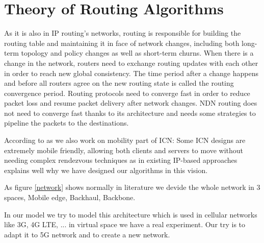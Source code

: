 

\chapter{Theory of Routing Algorithms} %
\label{dash7}


As it is also in IP routing's networks, routing is responsible for building the routing table and maintaining it in face of network changes, including both long-term topology and policy changes as well as short-term churns.  When there is a change in the network, routers need to exchange routing updates with each other in order to reach new global consistency. The time period after a change happens and before all routers agree on the new routing state is called the routing convergence period. Routing protocols need to converge fast in order to reduce packet loss and resume packet delivery after network changes. NDN routing does not need to converge fast thanks to its architecture and needs some strategies to pipeline the packets to the destinations.

According to \cite{oran} as we also work on mobility part of ICN: Some ICN designs are extremely mobile friendly, allowing  both  clients  and  servers  to  move  without  needing complex rendezvous techniques as in existing   IP-based approaches explains well why we have designed our algorithms in this vision.

As figure \ref{network} shows normally in literature we devide the whole network in 3 spaces, Mobile edge, Backhaul, Backbone. 

In our model we try to model this architecture which is used in cellular networks like 3G, 4G LTE, ... in virtual space we have a real experiment.
Our try is to adapt it to 5G network and to create a new network.
 



